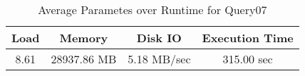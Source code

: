 \documentclass[../../main.tex]{subfiles}
\begin{document}
    \begin{table}
        \begin{center}
            \begin{tabular}{ |c|c|c|c| } 
            \hline
            Load & Memory & Disk IO & Execution Time\\
            \hline
            8.61 & 28937.86 MB & 5.18 MB/sec & 315.00 sec \\
            \hline
            \end{tabular}
            \\[1pt]
            \caption{Average Parametes over Runtime for Query07}
        \end{center}
    \end{table}
    \pagebreak
\end{document}
